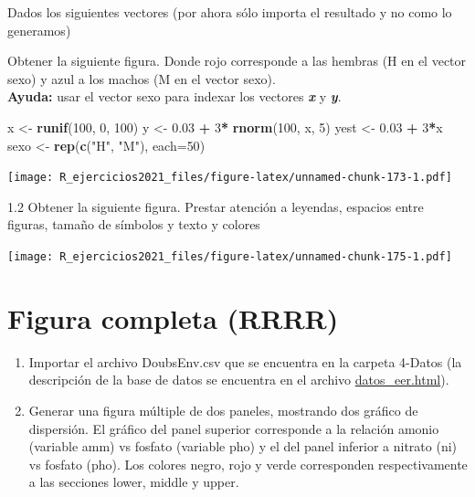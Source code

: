 \documentclass[]{book}
\newenvironment{Shaded}{\begin{snugshade}}{\end{snugshade}}
\newcommand{\DataTypeTok}[1]{\textcolor[rgb]{0.13,0.29,0.53}{#1}}
\newcommand{\DecValTok}[1]{\textcolor[rgb]{0.00,0.00,0.81}{#1}}
\newcommand{\FloatTok}[1]{\textcolor[rgb]{0.00,0.00,0.81}{#1}}
\newcommand{\KeywordTok}[1]{\textcolor[rgb]{0.13,0.29,0.53}{\textbf{#1}}}
\newcommand{\NormalTok}[1]{#1}
\newcommand{\OperatorTok}[1]{\textcolor[rgb]{0.81,0.36,0.00}{\textbf{#1}}}
\newcommand{\StringTok}[1]{\textcolor[rgb]{0.31,0.60,0.02}{#1}}
\begin{document}
Dados los siguientes vectores (por ahora sólo importa el resultado y no como lo generamos)

Obtener la siguiente figura. Donde rojo corresponde a las hembras (H en el vector sexo) y azul a los machos (M en el vector sexo).\\
\textbf{Ayuda:} usar el vector sexo para indexar los vectores \textbf{\emph{x}} y \textbf{\emph{y}}.

\begin{Shaded}
\begin{Highlighting}[]
\NormalTok{x <-}\StringTok{ }\KeywordTok{runif}\NormalTok{(}\DecValTok{100}\NormalTok{, }\DecValTok{0}\NormalTok{, }\DecValTok{100}\NormalTok{)}
\NormalTok{y <-}\StringTok{ }\FloatTok{0.03} \OperatorTok{+}\StringTok{ }\DecValTok{3}\OperatorTok{*}\StringTok{ }\KeywordTok{rnorm}\NormalTok{(}\DecValTok{100}\NormalTok{, x, }\DecValTok{5}\NormalTok{)}
\NormalTok{yest <-}\StringTok{ }\FloatTok{0.03} \OperatorTok{+}\StringTok{ }\DecValTok{3}\OperatorTok{*}\NormalTok{x}
\NormalTok{sexo <-}\StringTok{ }\KeywordTok{rep}\NormalTok{(}\KeywordTok{c}\NormalTok{(}\StringTok{"H"}\NormalTok{, }\StringTok{"M"}\NormalTok{), }\DataTypeTok{each=}\DecValTok{50}\NormalTok{)}
\end{Highlighting}
\end{Shaded}

\texttt{[image: R\_ejercicios2021\_files/figure-latex/unnamed-chunk-173-1.pdf]}

1.2 Obtener la siguiente figura. Prestar atención a leyendas, espacios entre figuras, tamaño de símbolos y texto y colores

\texttt{[image: R\_ejercicios2021\_files/figure-latex/unnamed-chunk-175-1.pdf]}

\hypertarget{figura-completa-rrrr}{%
\section{Figura completa (RRRR)}\label{figura-completa-rrrr}}

\begin{enumerate}
\def\labelenumi{\arabic{enumi}.}
\item
  Importar el archivo DoubsEnv.csv que se encuentra en la carpeta 4-Datos (la descripción de la base de datos se encuentra en el archivo \url{datos_eer.html}).
\item
  Generar una figura múltiple de dos paneles, mostrando dos gráfico de dispersión. El gráfico del panel superior corresponde a la relación amonio (variable amm) vs fosfato (variable pho) y el del panel inferior a nitrato (ni) vs fosfato (pho). Los colores negro, rojo y verde corresponden respectivamente a las secciones lower, middle y upper.
\end{enumerate}
\end{document}
